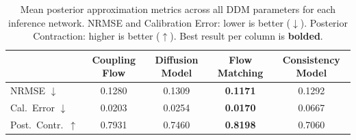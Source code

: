 \begin{table}[t]
\centering
\caption{Mean posterior approximation metrics across all DDM parameters for each inference network. NRMSE and Calibration Error: lower is better ($\downarrow$). Posterior Contraction: higher is better ($\uparrow$). Best result per column is \textbf{bolded}.}
\label{tab:baseline_comparison}
\begin{tabular}{lcccc}
\toprule
 & Coupling Flow & Diffusion Model & Flow Matching & Consistency Model \\
\midrule
NRMSE $\downarrow$        & 0.1280 & 0.1309 & \textbf{0.1171} & 0.1292 \\
Cal.\ Error $\downarrow$  & 0.0203 & 0.0254 & \textbf{0.0170} & 0.0667 \\
Post.\ Contr.\ $\uparrow$ & 0.7931 & 0.7460 & \textbf{0.8198} & 0.7060 \\
\bottomrule
\end{tabular}
\end{table}
